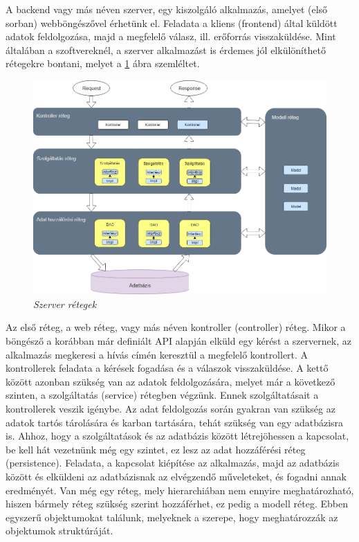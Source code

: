 
A backend vagy más néven szerver, egy kiszolgáló alkalmazás, amelyet (első sorban) webböngészővel érhetünk el. Feladata a kliens (frontend) által küldött adatok feldolgozása, majd a megfelelő válasz, ill. erőforrás visszaküldése. Mint általában a szoftvereknél, a szerver alkalmazást is érdemes jól elkülöníthető rétegekre bontani, melyet a \ref{fig:server-layers} ábra szemléltet.

\begin{figure}[!h]
	\centering
	\includegraphics[width=0.9\linewidth]{kepek/server-layers-colored.png}
	\caption{\textit{Szerver rétegek}}
	\label{fig:server-layers}
\end{figure}

Az első réteg, a web réteg, vagy más néven kontroller (controller) réteg. Mikor a böngésző a korábban már definiált API alapján elküld egy kérést a szervernek, az alkalmazás megkeresi a hívás címén keresztül a megfelelő kontrollert. A kontrollerek feladata a kérések fogadása és a válaszok visszaküldése.  A kettő között azonban szükség van az adatok feldolgozására, melyet már a következő szinten, a szolgáltatás (service) rétegben végzünk. Ennek szolgáltatásait a kontrollerek veszik igénybe. Az adat feldolgozás során gyakran van szükség az adatok tartós tárolására és karban tartására, tehát szükség van egy adatbázisra is. Ahhoz, hogy a szolgáltatások és az adatbázis között létrejöhessen a kapcsolat, be kell hát vezetnünk még egy szintet, ez lesz az adat hozzáférési réteg (persistence). Feladata, a kapcsolat kiépítése az alkalmazás, majd az adatbázis között és elküldeni az adatbázisnak az elvégzendő műveleteket, és fogadni annak eredményét. Van még egy réteg, mely hierarchiában nem ennyire meghatározható, hiszen bármely réteg szükség szerint hozzáférhet, ez pedig a modell réteg. Ebben egyszerű objektumokat találunk, melyeknek a szerepe, hogy meghatározzák az objektumok struktúráját.

